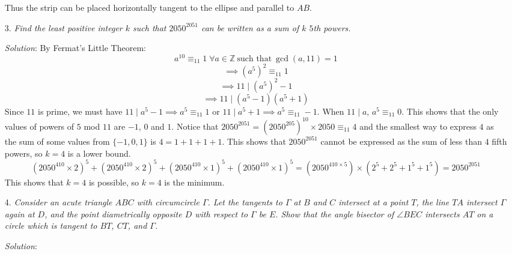 \documentclass{article}
\begin{document}
\begin{enumerate}
Thus the strip can be placed horizontally tangent to the ellipse and parallel to $AB$.


\item[3.] %
{\itshape
Find the least positive integer $k$ such that $2050^{2051}$ can be written as a sum of $k$ $5$th powers.
}

\textit{Solution}:
By Fermat's Little Theorem: 
$$a^{10} \equiv _{11} 1 \; \forall a \in \mathbb{Z} \ \text{such that}\ \gcd(a, 11) = 1$$ 
$$\implies (a^5)^2 \equiv _{11} 1$$
$$\implies 11 \mid (a^5)^2 - 1$$
$$\implies 11 \mid (a^5 - 1)(a^5 + 1)$$
Since $11$ is prime, we must have $11 \mid a^5 - 1 \implies a^5 \equiv _{11} 1$ or $11 \mid a^5 + 1 \implies a^5 \equiv _{11} -1$. When $11 \mid a$, $a^5 \equiv _{11} 0$.
This shows that the only values of powers of $5$ mod $11$ are $-1$, $0$ and $1$. Notice that $2050^{2051} = (2050^{205})^{10} \times 2050 \equiv _{11} 4$ and the smallest way to express $4$ as the sum of some values from $\{-1, 0, 1\}$ is $4 = 1 + 1 + 1 + 1$.
This shows that $2050^{2051}$ cannot be expressed as the sum of less than $4$ fifth powers, so $k = 4$ is a lower bound.
$$(2050^{410} \times 2)^5 + (2050^{410} \times 2)^5 + (2050^{410} \times 1)^5 + (2050^{410} \times 1)^5 = (2050^{410 \times 5}) \times (2^5 + 2^5 + 1^5 + 1^5) = 2050^{2051}$$
This shows that $k = 4$ is possible, so $k = 4$ is the minimum.


\item[4.] %
{\itshape
Consider an acute triangle $ABC$ with circumcircle $\Gamma$.
Let the tangents to $\Gamma$ at $B$ and $C$ intersect at a point $T$, the line $TA$ intersect $\Gamma$ again at $D$, and the point diametrically opposite $D$ with respect to $\Gamma$ be $E$.
Show that the angle bisector of $\angle BEC$ intersects $AT$ on a circle which is tangent to $BT$, $CT$, and $\Gamma$.
}

\textit{Solution}:


\end{enumerate}
\end{document}
